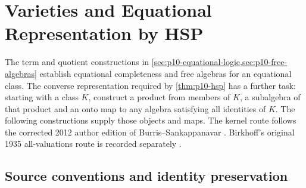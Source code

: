 \section{Varieties and Equational Representation by HSP}
\label{sec:p10-hsp-equational-representation}

The term and quotient constructions in
\cref{sec:p10-equational-logic,sec:p10-free-algebras} establish
equational completeness and free algebras for an equational class.
The converse representation required by
\cref{thm:p10-hsp} has a further task: starting with a class \(K\),
construct a product from members of \(K\), a subalgebra of that
product and an onto map to any algebra satisfying all identities
of \(K\). The following constructions supply those objects and maps.
The kernel route follows the corrected 2012 author edition of
Burris--Sankappanavar \cite[II\S\S9--11]{BurrisSankappanavar2012}.
Birkhoff's original 1935 all-valuations route is recorded separately
\cite[\S\S7--10, pp.\ 437--441]{Birkhoff1935}.

\subsection{Source conventions and identity preservation}
\label{sec:p10-hsp-conventions}

